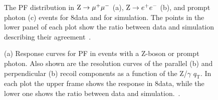 \begin{figure}[!htb]
\begin{center}
\end{center} 
\caption{The PF \ETmiss distribution in $\mathrm{Z}\to\mu^+\mu^-$ (a), $\mathrm{Z}\to e^+e^-$ (b), and prompt photon (c) events for 8\TeV data and for simulation. The points in the lower panel of each plot show the ratio between data and simulation describing their agreement~\cite{Khachatryan:2014gga}.}
\label{fig:met_distr}
\end{figure}

\begin{figure}[!htb]
\begin{center}
\end{center} 
\caption{(a) Response curves for PF \ptvecmiss in events with a Z-boson or prompt photon.
Also shown are the resolution curves of the parallel (b) and perpendicular (b) recoil components as a function of the Z/$\gamma$ $q_\mathrm{T}$. 
In each plot the upper frame shows the response in 8\TeV data, while the lower one shows the ratio between data and simulation.~\cite{Khachatryan:2014gga}.}
\label{fig:met_resol}
\end{figure}
